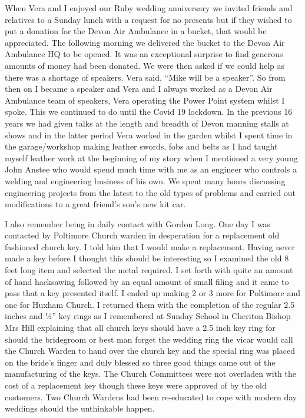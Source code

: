 When Vera and I enjoyed our Ruby wedding anniversary we invited friends and
relatives to a Sunday lunch with a request for no presents but if they wished
to put a donation for the Devon Air Ambulance in a bucket, that would be
appreciated.  The following morning we delivered the bucket   to the Devon Air
Ambulance HQ to be opened.  It was an exceptional surprise to find generous
amounts of money had been donated.  We were then asked if we could help as
there was a shortage of speakers.  Vera said, ``Mike will be a speaker''.  So
from then on I became a speaker and Vera and I always worked as a Devon Air
Ambulance team of speakers, Vera operating the Power Point system whilst I
spoke.  This we continued to do until the Covid 19 lockdown.  In the previous
16 years we had given talks at the length and breadth of Devon manning stalls
at shows and in the latter period Vera worked in the garden whilst I spent time
in the garage/workshop making leather swords, fobs and belts as I had taught
myself leather work at the beginning of my story when I mentioned a very young
John Anstee who would spend much time with me as an engineer who controls a
welding and engineering business of his own.  We spent many hours discussing
engineering projects from the latest to the old types of problems and carried
out modifications to a great friend's son's new kit car.

I also remember being in daily contact with Gordon Long.  One day I was
contacted by Poltimore Church warden in desperation for a replacement old
fashioned church key.  I told him that I would make a replacement.  Having
never made a key before I thought this should be interesting so I examined the
old 8 feet long item and selected the metal required.  I set forth with quite
an amount of hand hacksawing followed by an equal amount of small filing and it
came to pass that a key presented itself.  I ended up making 2 or 3 more for
Poltimore and one for Huxham Church.  I returned them with the completion of
the regular 2.5 inches and ¼'' key rings as I remembered at Sunday School in
Cheriton Bishop Mrs Hill explaining that all church keys should have a 2.5 inch
key ring for should the bridegroom or best man forget the wedding ring the
vicar would call the Church Warden to hand over the church key and the special
ring was placed on the bride's finger and duly blessed so three good things
came out of the manufacturing of the keys.  The Church Committees were not
overladen with the cost of a replacement key though these keys were approved of
by the old customers. Two Church Wardens had been re-educated to cope with
modern day weddings should the unthinkable happen.

